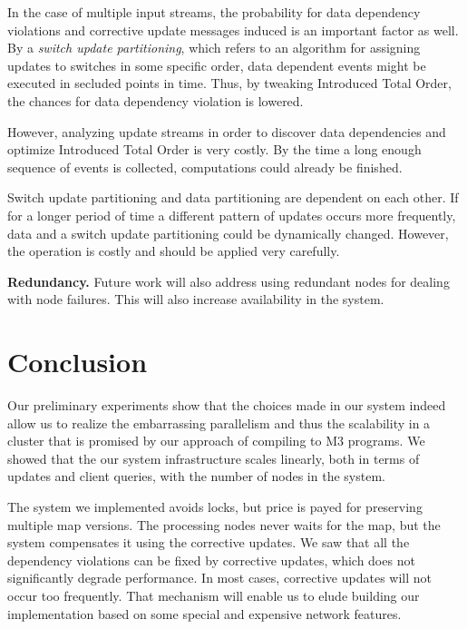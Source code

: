 \documentclass{sig-semester}
\begin{document}
In the case of multiple input streams, the probability for data dependency violations and corrective update messages induced is an important factor as well. By a \textit{switch update partitioning}, which refers to an algorithm for assigning updates to switches in some specific order, data dependent events might be executed in secluded points in time. Thus, by tweaking Introduced Total Order, the chances for data dependency violation is lowered.

However, analyzing update streams in order to discover data dependencies and optimize Introduced Total Order is very costly. By the time a long enough sequence of events is collected, computations could already be finished.

Switch update partitioning and data partitioning are dependent on each other. If for a longer period of time a different pattern of updates occurs more frequently, data and a switch update partitioning could be dynamically changed. However, the operation is costly and should be applied very carefully.

\textbf{Redundancy.} Future work will also address using redundant nodes for dealing with node failures. This will also increase availability in the system.

\section{Conclusion}
\label{sec:Conclusion}
\vspace{2mm}

Our preliminary experiments show that the choices made in our
system indeed allow us to realize the embarrassing parallelism and
thus the scalability in a cluster that is promised by our approach of
compiling to M3 programs.  We showed that the our system infrastructure scales linearly, both in terms of updates and client queries, with the number of nodes in the system.

The system we implemented avoids locks, but price is payed for preserving multiple map versions. The processing nodes never waits for the map, but the system compensates it using the corrective updates. We saw that all the dependency violations can be fixed by corrective updates, which does not significantly degrade performance. In most cases, corrective updates will not occur too frequently. That mechanism will enable us to elude building our implementation based on some special and expensive network features.

{


}

\newpage
\end{document}
